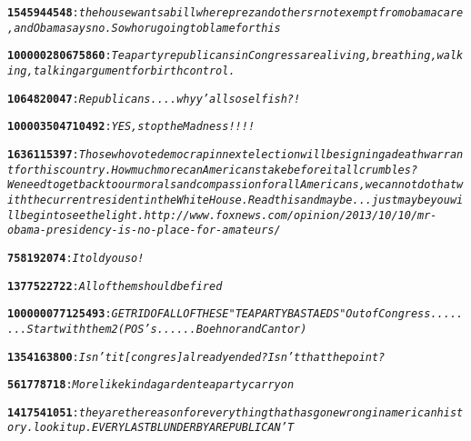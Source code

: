 \begin{alltt}
\textbf{1545944548}: \emph{the house wants a bill where  prez and others r not exempt from obamacare, and  Obama says no.  So who r u going to blame for this}

\textbf{100000280675860}: \emph{Tea party republicans in Congress are a living, breathing, walking, talking argument for birth control.}

\textbf{1064820047}: \emph{Republicans....why y'all so selfish?!}

\textbf{100003504710492}: \emph{YES, stop the Madness!!!!}

\textbf{1636115397}: \emph{Those who vote democrap in next election will be signing a death warrant for this country. How much more can Americans take before it all crumbles? We need to get back to our morals and compassion for all Americans, we cannot do that with the current resident in the White House. Read this and maybe...just maybe you will begin to see the light.   http://www.foxnews.com/opinion/2013/10/10/mr-obama-presidency-is-no-place-for-amateurs/}

\textbf{758192074}: \emph{I told you so!}

\textbf{1377522722}: \emph{All of them should be fired}

\textbf{100000077125493}: \emph{GET RID OF ALL OF THESE " TEA PARTY BASTAEDS" Out of Congress........Start with them 2 (POS's......Boehnor and Cantor)}

\textbf{1354163800}: \emph{Isn't it [congres] already ended? Isn't that the point?}

\textbf{561778718}: \emph{More like kinda garden tea party carry on}

\textbf{1417541051}: \emph{they are the reason for everything that has gone wrong in american history. look it up. EVERY LAST BLUNDER BY A REPUBLICAN'T}


\end{alltt}
